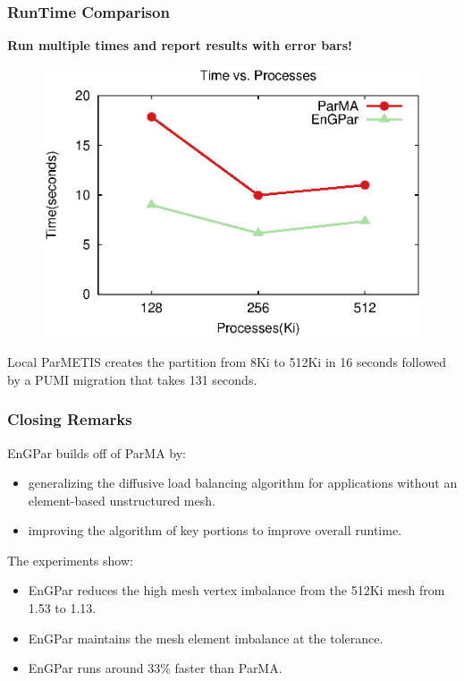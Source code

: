 \documentclass{beamer}
\begin{document}
\begin{frame}
  \frametitle{RunTime Comparison}
  \textbf{Run multiple times and report results with error bars!}
  \begin{figure}
    \centering
    \includegraphics[width=.5\textwidth]{figures/time_v_cores.eps}
  \end{figure}
  Local ParMETIS creates the partition from 8Ki to 512Ki in 16 seconds followed by a PUMI migration that takes 131 seconds.
  
\end{frame}

\begin{frame}
  \frametitle{Closing Remarks}
  EnGPar builds off of ParMA by:
  \begin {itemize}
  \item generalizing the diffusive load balancing algorithm for applications without an element-based unstructured mesh.
  \item improving the algorithm of key portions to improve overall runtime.
  \end{itemize}
  The experiments show:
  \begin {itemize}
  \item EnGPar reduces the high mesh vertex imbalance from the 512Ki mesh from 1.53 to 1.13.
  \item EnGPar maintains the mesh element imbalance at the tolerance.
  \item EnGPar runs around 33\% faster than ParMA.
  \end{itemize}
  
    
\end{frame}
\end{document}
